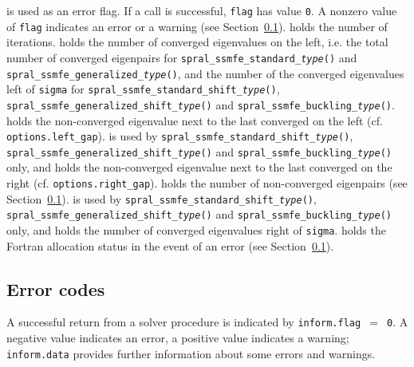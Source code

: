 \begin{description}
%
is used as an error flag.
If a call is successful, {\tt flag} has value {\tt 0}.
A nonzero value of {\tt flag} indicates an error or a warning
(see Section~\ref{sec:err}).
%
 holds the number of iterations.
%
 holds 
the number of converged eigenvalues on the left,
i.e. the total number of converged eigenpairs for 
{\tt spral\_ssmfe\_standard\_\textit{type}()} and {\tt spral\_ssmfe\_generalized\_\textit{type}()},
and the number of the converged eigenvalues left of {\tt sigma}
for {\tt spral\_ssmfe\_standard\_shift\_\textit{type}()},
{\tt spral\_ssmfe\_generalized\_shift\_\textit{type}()}
and {\tt spral\_ssmfe\_buckling\_\textit{type}()}.
%
 holds
the non-converged eigenvalue next to the last converged on the left
(cf. {\tt options.left\_gap}).
%
 is used by
{\tt spral\_ssmfe\_standard\_shift\_\textit{type}()},
{\tt spral\_ssmfe\_generalized\_shift\_\textit{type}()}
and {\tt spral\_ssmfe\_buckling\_\textit{type}()} only, and holds
the non-converged eigenvalue next to the last converged on the right
(cf. {\tt options.right\_gap}).
%
holds the number of non-converged eigenpairs
(see Section~\ref{sec:err}).
%
 is used by 
{\tt spral\_ssmfe\_standard\_shift\_\textit{type}()},
{\tt spral\_ssmfe\_generalized\_shift\_\textit{type}()}
and {\tt spral\_ssmfe\_buckling\_\textit{type}()} only, and holds
the number of converged eigenvalues right of {\tt sigma}.
%
 holds the Fortran allocation status in the event of an error
(see Section~\ref{sec:err}).
%
\end{description}

\subsection{Error codes}

\label{sec:err}

A successful return from 
a solver procedure
is indicated 
by {\tt inform.flag $=$ 0}.
A negative value indicates an error, a positive value indicates a warning;
{\tt inform.data} provides further information
about some errors and warnings. 

